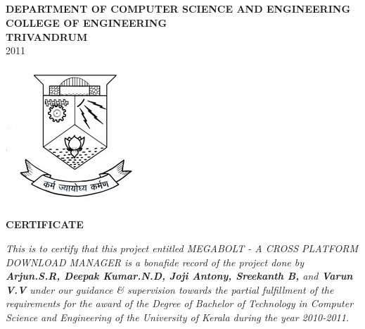 \documentclass[pdftex,12pt,a4paper,pdfencoding=unicode]{article}
\begin{document}
\begin{onehalfspace}
  \section*{}
  \thispagestyle{empty}
  \begin{center}
    {\large \bf DEPARTMENT OF COMPUTER SCIENCE AND ENGINEERING}\\
    {\small \bf COLLEGE OF ENGINEERING}\\
    {\small \bf TRIVANDRUM}\\
    {\small 2011}\\
    \vspace{5mm}
    \includegraphics[scale=0.75]{pic/cetemblem.jpg}\\
                    {\large \bf CERTIFICATE}\\[0.75cm]
  \end{center}
      {\it This is to certify that this project entitled {\textsc MEGABOLT - A CROSS PLATFORM DOWNLOAD MANAGER}
        is a bonafide record of the project done by {\bf \emph{Arjun.S.R, Deepak Kumar.N.D, Joji Antony, Sreekanth B,}}
        and {\bf \emph{Varun V.V}} under our guidance \& supervision towards the partial fulfillment of the requirements
        for the award of the Degree of Bachelor of Technology in Computer Science and Engineering of the University of
        Kerala during the year 2010-2011.}


\end{onehalfspace}
\end{document}
